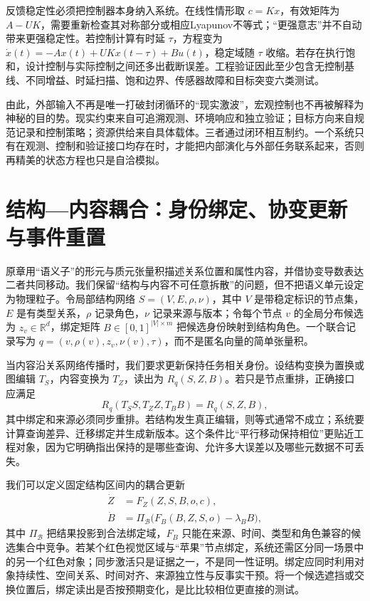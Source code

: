 反馈稳定性必须把控制器本身纳入系统。在线性情形取 $c=Kx$，有效矩阵为 $A-UK$，需要重新检查其对称部分或相应Lyapunov不等式；“更强意志”并不自动带来更强稳定性。若控制计算有时延 $\tau$，方程变为 $\dot x(t)=-Ax(t)+UKx(t-\tau)+Bu(t)$，稳定域随 $\tau$ 收缩。若存在执行饱和，设计控制与实际控制之间还多出截断误差。工程验证因此至少包含无控制基线、不同增益、时延扫描、饱和边界、传感器故障和目标突变六类测试。

由此，外部输入不再是唯一打破封闭循环的“现实激波”，宏观控制也不再被解释为神秘的目的势。现实约束来自可追溯观测、环境响应和独立验证；目标方向来自规范记录和控制策略；资源供给来自具体载体。三者通过闭环相互制约。一个系统只有在观测、控制和验证接口均存在时，才能把内部演化与外部任务联系起来，否则再精美的状态方程也只是自洽模拟。

\section{结构—内容耦合：身份绑定、协变更新与事件重置}
\label{sec:micro_structure_of_inertia}

原章用“语义子”的形元与质元张量积描述关系位置和属性内容，并借协变导数表达二者共同移动。我们保留“结构与内容不可任意拆散”的问题，但不把语义单元设定为物理粒子。令局部结构网络 $S=(V,E,\rho,\nu)$，其中 $V$ 是带稳定标识的节点集，$E$ 是有类型关系，$\rho$ 记录角色，$\nu$ 记录来源与版本；令每个节点 $v$ 的全局分布候选为 $z_v\in\mathbb R^d$，绑定矩阵 $B\in[0,1]^{|V|\times m}$ 把候选身份映射到结构角色。一个联合记录写为 $q=(v,\rho(v),z_v,\nu(v),\tau)$，而不是匿名向量的简单张量积。

当内容沿关系网络传播时，我们要求更新保持任务相关身份。设结构变换为置换或图编辑 $T_S$，内容变换为 $T_Z$，读出为 $R_q(S,Z,B)$。若只是节点重排，正确接口应满足
\begin{equation}
 R_q(T_S S,T_Z Z,T_B B)=R_q(S,Z,B),
\end{equation}
其中绑定和来源必须同步重排。若结构发生真正编辑，则等式通常不成立；系统要计算查询差异、迁移绑定并生成新版本。这个条件比“平行移动保持相位”更贴近工程对象，因为它明确指出保持的是哪些查询、允许多大误差以及哪些元数据不可丢失。

我们可以定义固定结构区间内的耦合更新
\begin{align}
 \dot Z&=F_Z(Z,S,B,o,c),\\
 \dot B&=\Pi_{\mathcal B}\bigl(F_B(B,Z,S,o)-\lambda_B B\bigr),
\end{align}
其中 $\Pi_{\mathcal B}$ 把结果投影到合法绑定域，$F_B$ 只能在来源、时间、类型和角色兼容的候选集合中竞争。若某个红色视觉区域与“苹果”节点绑定，系统还需区分同一场景中的另一个红色对象；同步激活只是证据之一，不是同一性证明。绑定应同时利用对象持续性、空间关系、时间对齐、来源独立性与反事实干预。将一个候选遮挡或交换位置后，绑定读出是否按预期变化，是比比较相位更直接的测试。

